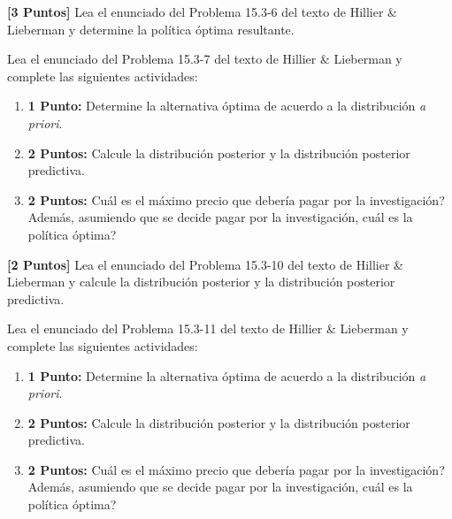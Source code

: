 \documentclass[ a4paper, twoside, 11pt]{article}
\begin{document}
\begin{problem}
\label{prob:H&L_P15_3_6}
\textbf{[3 Puntos]} Lea el enunciado del Problema 15.3-6 del texto de Hillier \& Lieberman y determine la pol\'itica \'optima resultante. 

\end{problem}
\fullskip

\begin{problem}
\label{prob:H&L_P15_3_7} Lea el enunciado del Problema 15.3-7 del texto de Hillier \& Lieberman y complete las siguientes actividades: 
\begin{enumerate}[label=\textbf{\alph*)}]
\item \textbf{1 Punto:} Determine la alternativa \'optima de acuerdo a la distribuci\'on \emph{a priori}. 
\item \textbf{2 Puntos:} Calcule la distribuci\'on posterior y la distribuci\'on posterior predictiva. 
\item \textbf{2 Puntos:} Cu\'al es el m\'aximo precio que deber\'ia pagar por la investigaci\'on? Adem\'as, asumiendo que se decide pagar por la investigaci\'on, cu\'al es la pol\'itica \'optima?  
\end{enumerate}

\end{problem}
\fullskip

\begin{problem}
\label{prob:H&L_P15_3_10}
\textbf{[2 Puntos]} Lea el enunciado del Problema 15.3-10 del texto de Hillier \& Lieberman y calcule la distribuci\'on posterior y la distribuci\'on posterior predictiva. 

\end{problem}
\fullskip

\begin{problem}
\label{prob:H&L_P15_3_11} Lea el enunciado del Problema 15.3-11 del texto de Hillier \& Lieberman y complete las siguientes actividades: 
\begin{enumerate}[label=\textbf{\alph*)}]
\item \textbf{1 Punto:} Determine la alternativa \'optima de acuerdo a la distribuci\'on \emph{a priori}. 
\item \textbf{2 Puntos:} Calcule la distribuci\'on posterior y la distribuci\'on posterior predictiva. 
\item \textbf{2 Puntos:} Cu\'al es el m\'aximo precio que deber\'ia pagar por la investigaci\'on? Adem\'as, asumiendo que se decide pagar por la investigaci\'on, cu\'al es la pol\'itica \'optima?  
\end{enumerate}

\end{problem}
\fullskip
\end{document}

